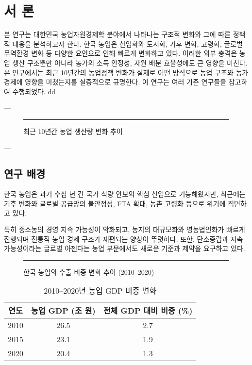 \chapter{서 론}



본 연구는 대한민국 농업자원경제학 분야에서 나타나는 구조적 변화와 그에 따른 정책적 대응을 분석하고자 한다.  
한국 농업은 산업화와 도시화, 기후 변화, 고령화, 글로벌 무역환경 변화 등 다양한 요인으로 인해 빠르게 변화하고 있다.  
이러한 외부 충격은 농업 생산 구조뿐만 아니라 농가의 소득 안정성, 자원 배분 효율성에도 큰 영향을 미친다.  
본 연구에서는 최근 10년간의 농업정책 변화가 실제로 어떤 방식으로 농업 구조와 농가 경제에 영향을 미쳤는지를 실증적으로 규명한다.
이 연구는 여러 기존 연구들\cite{hong2020latex,doe2019intro}을 참고하여 수행되었다.
dd

---

\begin{figure}[htbp]
  \centering
  \caption{최근 10년간 농업 생산량 변화 추이}\label{fig:chapter1_1}

  \rule{0.7\linewidth}{5cm} %
\end{figure}

---

\section{연구 배경}

한국 농업은 과거 수십 년 간 국가 식량 안보의 핵심 산업으로 기능해왔지만,  
최근에는 기후 변화와 글로벌 공급망의 불안정성, FTA 확대, 농촌 고령화 등으로 위기에 직면하고 있다.  

특히 중소농의 경영 지속 가능성이 악화되고, 농지의 대규모화와 영농법인화가 빠르게 진행되며  
전통적 농업 경제 구조가 재편되는 양상이 뚜렷하다. 또한, 탄소중립과 지속가능성이라는 글로벌 아젠다는  
농업 부문에서도 새로운 기준과 제약을 요구하고 있다.

\begin{figure}[htbp]
  \centering
  \rule{0.65\linewidth}{5cm}
  \caption{한국 농업의 수출 비중 변화 추이 (2010–2020)}\label{fig:chapter1_2}
\end{figure}

\begin{table}[htbp]
  \centering
  \begin{tabular}{|c|c|c|}
    \hline
    연도 & 농업 GDP (조 원) & 전체 GDP 대비 비중 (\%) \\
    \hline
    2010 & 26.5 & 2.7 \\
    2015 & 23.1 & 1.9 \\
    2020 & 20.4 & 1.3 \\
    \hline
  \end{tabular}
  \caption{2010–2020년 농업 GDP 비중 변화}\label{tab:chapter1_1}
\end{table}



